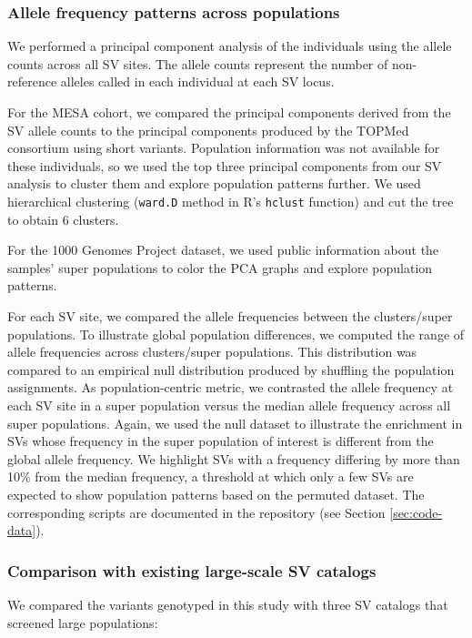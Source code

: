 \documentclass[11pt]{ucscthesis}
\begin{document}
\subsubsection{Allele frequency patterns across populations}
\label{subsec:sv-pop-freq}


We performed a principal component analysis of the individuals using the allele counts across all SV sites.
The allele counts represent the number of non-reference alleles called in each individual at each SV locus.

For the MESA cohort, we compared the principal components derived from the SV allele counts to the principal components produced by the TOPMed consortium using short variants.
Population information was not available for these individuals, so we used the top three principal components from our SV analysis to cluster them and explore population patterns further.
We used hierarchical clustering (\verb!ward.D! method in R's \verb!hclust! function) and cut the tree to obtain 6 clusters.

For the 1000 Genomes Project dataset, we used public information about the samples' super populations to color the PCA graphs and explore population patterns.

For each SV site, we compared the allele frequencies between the clusters/super populations.
To illustrate global population differences, we computed the range of allele frequencies across clusters/super populations.
This distribution was compared to an empirical null distribution produced by shuffling the population assignments.
As population-centric metric, we contrasted the allele frequency at each SV site in a super population versus the median allele frequency across all super populations.
Again, we used the null dataset to illustrate the enrichment in SVs whose frequency in the super population of interest is different from the global allele frequency.
We highlight SVs with a frequency differing by more than 10\% from the median frequency, a threshold at which only a few SVs are expected to show population patterns based on the permuted dataset.
The corresponding scripts are documented in the repository (see Section \ref{sec:code-data}).

\subsubsection{Comparison with existing large-scale SV catalogs}

We compared the variants genotyped in this study with three SV catalogs that screened large populations:
\end{document}
